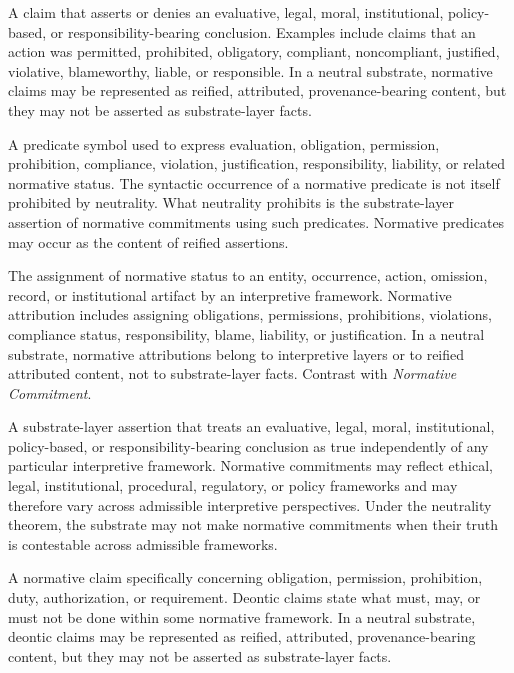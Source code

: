 \begin{description}[style=nextline,leftmargin=1.5cm]

\item[Normative Claim]
A claim that asserts or denies an evaluative,
legal, moral, institutional, policy-based,
or responsibility-bearing conclusion.
Examples include claims that an action was permitted,
prohibited, obligatory, compliant, noncompliant,
justified, violative, blameworthy, liable, or responsible.
In a neutral substrate, normative claims may be represented
as reified, attributed, provenance-bearing content,
but they may not be asserted as substrate-layer facts.

\item[Normative Predicate]
A predicate symbol used to express evaluation,
obligation, permission, prohibition, compliance,
violation, justification, responsibility, liability,
or related normative status.
The syntactic occurrence of a normative predicate
is not itself prohibited by neutrality.
What neutrality prohibits is the substrate-layer assertion
of normative commitments using such predicates.
Normative predicates may occur as the content
of reified assertions.

\item[Normative Attribution]
The assignment of normative status to an entity,
occurrence, action, omission, record, or institutional artifact
by an interpretive framework.
Normative attribution includes assigning obligations,
permissions, prohibitions, violations, compliance status,
responsibility, blame, liability, or justification.
In a neutral substrate, normative attributions belong
to interpretive layers or to reified attributed content,
not to substrate-layer facts.
Contrast with \emph{Normative Commitment}.

\item[Normative Commitment]
A substrate-layer assertion that treats an evaluative,
legal, moral, institutional, policy-based,
or responsibility-bearing conclusion as true
independently of any particular interpretive framework.
Normative commitments may reflect ethical, legal,
institutional, procedural, regulatory, or policy frameworks
and may therefore vary across admissible interpretive perspectives.
Under the neutrality theorem, the substrate may not make normative
commitments when their truth is contestable across admissible frameworks.

\item[Deontic Claim]
A normative claim specifically concerning obligation,
permission, prohibition, duty, authorization,
or requirement.
Deontic claims state what must, may, or must not be done
within some normative framework.
In a neutral substrate, deontic claims may be represented
as reified, attributed, provenance-bearing content,
but they may not be asserted as substrate-layer facts.


\end{description}
